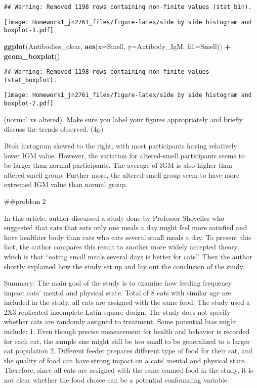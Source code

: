 \documentclass[]{article}
\newenvironment{Shaded}{\begin{snugshade}}{\end{snugshade}}
\newcommand{\DataTypeTok}[1]{\textcolor[rgb]{0.13,0.29,0.53}{#1}}
\newcommand{\KeywordTok}[1]{\textcolor[rgb]{0.13,0.29,0.53}{\textbf{#1}}}
\newcommand{\NormalTok}[1]{#1}
\newcommand{\OperatorTok}[1]{\textcolor[rgb]{0.81,0.36,0.00}{\textbf{#1}}}
\newcommand{\StringTok}[1]{\textcolor[rgb]{0.31,0.60,0.02}{#1}}
\begin{document}
\begin{verbatim}
## Warning: Removed 1198 rows containing non-finite values (stat_bin).
\end{verbatim}

\texttt{[image: Homework1\_jn2761\_files/figure-latex/side by side histogram and boxplot-1.pdf]}

\begin{Shaded}
\begin{Highlighting}[]
\KeywordTok{ggplot}\NormalTok{(Antibodies_clear, }\KeywordTok{aes}\NormalTok{(}\DataTypeTok{x=}\NormalTok{Smell, }\DataTypeTok{y=}\NormalTok{Antibody_IgM, }\DataTypeTok{fill=}\NormalTok{Smell)) }\OperatorTok{+}\StringTok{ }
\StringTok{    }\KeywordTok{geom_boxplot}\NormalTok{()}
\end{Highlighting}
\end{Shaded}

\begin{verbatim}
## Warning: Removed 1198 rows containing non-finite values (stat_boxplot).
\end{verbatim}

\texttt{[image: Homework1\_jn2761\_files/figure-latex/side by side histogram and boxplot-2.pdf]}

(normal vs altered). Make sure you label your figures appropriately and
briefly discuss the trends observed. (4p)

Btoh histogram skewed to the right, with most participants having
relatively lower IGM value. However, the variation for altered-smell
participants seems to be larger than normal participants. The average of
IGM is also higher than altered-smell group. Further more, the
altered-smell group seem to have more extremed IGM value than normal
group.

\#\#problem 2

In this article, author discussed a study done by Professor Shoveller
who suggested that cats that eats only one meals a day might feel more
satisfied and have healthier body than cats who eats several small meals
a day. To present this fact, the author compares this result to another
more widely accepted theory, which is that ``eating small meals several
days is better for cats''. Then the author shortly explained how the
study set up and lay out the conclusion of the study.

Summary: The main goal of the study is to examine how feeding frequency
impact cats' mental and physical state. Total of 8 cats with similar age
are included in the study, all cats are assigned with the same food. The
study used a 2X3 replicated incomplete Latin square design. The study
does not specify whether cats are randomly assigned to treatment. Some
potential bias might include: 1. Even though precise measurement for
health and behavior is recorded for each cat, the sample size might
still be too small to be generalized to a larger cat population 2.
Different feeder prepares different type of food for their cat, and the
quality of food can have strong impact on a cats' mental and physical
state. Therefore, since all cats are assigned with the same canned food
in the study, it is not clear whether the food choice can be a potential
confounding variable.
\end{document}
